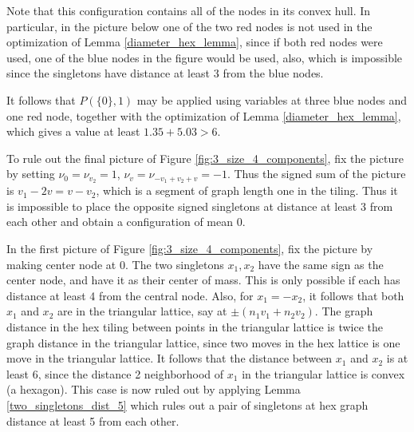 \documentclass[a4paper, 12pt, notitlepage]{amsart}
\theoremstyle{remark}
\begin{document}
 
Note that this configuration contains all of the nodes in its convex hull.  In particular, in the picture below one of the two red nodes is not used in the optimization of Lemma \ref{diameter_hex_lemma}, since if both red nodes were used, one of the blue nodes in the figure would be used, also, which is impossible since the singletons have distance at least 3 from the blue nodes.


 

 It follows that $P(\{0\},1)$ may be applied using variables at three blue nodes and one red node,  together with the optimization of Lemma \ref{diameter_hex_lemma}, which gives a value at least $1.35 + 5.03 > 6$.  
 
 To rule out the final picture of Figure \ref{fig:3_size_4_components}, fix the picture by setting $\nu_0 = \nu_{v_2} = 1$, $\nu_v = \nu_{-v_1 + v_2 + v} =-1$.
  Thus the signed sum of the picture is $v_1-2v = v-v_2$, which is a segment of graph length one in the tiling.  Thus it is impossible to place the opposite signed singletons at distance at least 3 from each other and obtain a configuration of mean 0.
 
 
 In the first picture of Figure \ref{fig:3_size_4_components}, fix the picture by making center node at 0.  The two singletons $x_1, x_2$ have the same sign as the center node, and have it as their center of mass. This is only possible if each has distance at least 4 from the central node. Also, for $x_1 = -x_2$, it follows that both $x_1$ and $x_2$ are in the triangular lattice, say at $\pm(n_1v_1 + n_2 v_2)$.  The graph distance in the hex tiling between points in the triangular lattice is twice the graph distance in the triangular lattice, since two moves in the hex lattice is one move in the triangular lattice.  It follows that the distance between $x_1$ and $x_2$ is at least 6, since the distance 2 neighborhood of $x_1$ in the triangular lattice is convex (a hexagon).    This case is now ruled out by applying  Lemma \ref{two_singletons_dist_5} which rules out a pair of singletons at hex graph distance at least 5 from each other.  
 
  
 
\end{document}

